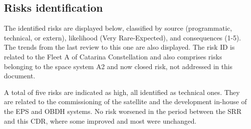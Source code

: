 \subsection{Risks identification} \label{sec:risks}

The identified risks are displayed below, classified by source (programmatic, technical, or extern), likelihood (Very Rare-Expected), and consequences (1-5). The trends from the last review to this one are also displayed. The risk \ac{ID} is related to the Fleet A of Catarina Constellation and also comprises risks belonging to the space system A2 and now closed risk, not addressed in this document.

A total of five risks are indicated as high, all identified as technical ones. They are related to the commissioning of the satellite and the development in-house of the \ac{EPS} and \ac{OBDH} systems. No risk worsened in the period between the SRR and this \ac{CDR}, where some improved and most were unchanged.

